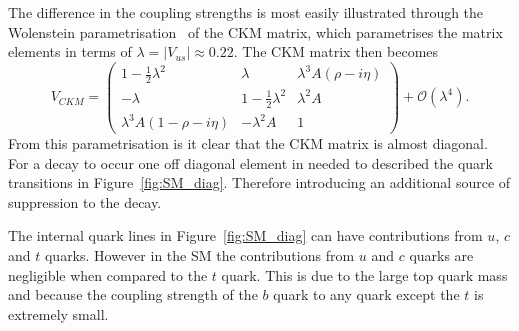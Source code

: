 The difference in the coupling strengths is most easily illustrated through the Wolenstein parametrisation~\cite{} of the CKM matrix, which parametrises the matrix elements in terms of $\lambda = |V_{us}| \approx 0.22$. The CKM matrix then becomes
\begin{equation}
V_{CKM} =
 \begin{pmatrix}
 1 - \frac{1}{2}\lambda^2 & \lambda & \lambda^3 A (\rho - i \eta) \\
 - \lambda                & 1 - \frac{1}{2}\lambda^2 & \lambda^2 A \\
 \lambda^3 A (1 - \rho- i \eta) & -\lambda^2 A & 1
 \end{pmatrix} + \mathcal{O}(\lambda^4).
\label{eq:CKMB}
\end{equation}
From this parametrisation is it clear that the CKM matrix is almost diagonal. For a \bmumu decay to occur one off diagonal element in needed to described the quark transitions in Figure~\ref{fig:SM_diag}. Therefore introducing an additional source of suppression to the decay. 

The internal quark lines in Figure~\ref{fig:SM_diag} can have contributions from $u$, $c$ and $t$ quarks. However in the SM the contributions from $u$ and $c$ quarks are negligible when compared to the $t$ quark. This is due to the large top quark mass and because the coupling strength of the $b$ quark to any quark except the $t$ is extremely small.


